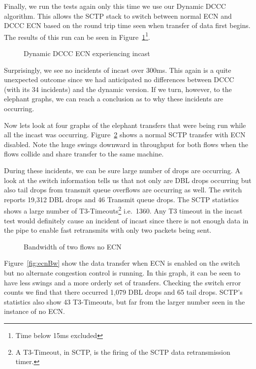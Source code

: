 \documentclass[12pt]{article}
\begin{document}
\newpage

Finally, we run the tests again only this time we use our Dynamic DCCC algorithm. This allows the
SCTP stack to switch between normal ECN and DCCC ECN based on the round trip time
seen when transfer of data first begins. The results of this run can be seen in Figure~\ref{fig:dynIncast}\footnote{Time below 15ms excluded}.


\begin{figure}[h]
\centering
{}
\caption{Dynamic DCCC ECN experiencing incast}
\label{fig:dynIncast}
\end{figure}

Surprisingly, we see no incidents of incast over 300ms. This again is a quite unexpected
outcome since we had anticipated no differences between DCCC (with its 34 incidents) and
the dynamic version. If we turn, however, to the elephant graphs, we can reach a conclusion
as to why these incidents are occurring.

\newpage

Now lets look at four graphs of the elephant transfers that were being run while all
the incast was occurring. Figure~\ref{fig:noEcnBw} shows a normal SCTP transfer with
ECN disabled. Note the huge swings downward in throughput for both
flows when the flows collide and share transfer to the same machine. 

During these incidents, we can be sure large number of drops are occurring. A look at the switch
information tells us that not only are DBL drops occurring but also tail
drops from transmit queue overflows are occurring as well.  The switch reports 19,312 DBL drops
and 46 Transmit queue drops. The SCTP statistics shows
a large number of T3-Timeouts\footnote{A T3-Timeout, in SCTP, is the firing of the SCTP data retransmission timer.}
 i.e.~1360. Any T3 timeout in the incast test would definitely
cause an incident of incast since there is not enough data in the pipe to enable fast retransmits with
only two packets being sent.

\begin{figure}[h]
\centering
{}
\caption{Bandwidth of two flows no ECN}
\label{fig:noEcnBw}
\end{figure}


\newpage

Figure~\ref{fig:ecnBw} show the data transfer when ECN is enabled on
the switch but no alternate congestion control is running. In this graph,
it can be seen to have  less swings and a more orderly set of transfers. Checking
the switch error counts we find that there occurred 1,079 DBL drops and 65 tail
drops. SCTP's statistics also show 43 T3-Timeouts, but far from the larger
number seen in the instance of no ECN.
\end{document}
